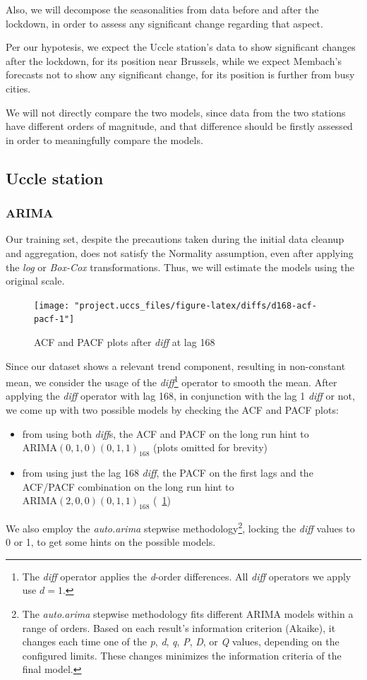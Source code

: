\documentclass[12pt]{article}
\begin{document}
Also, we will decompose the seasonalities from data before and after the lockdown, in order to assess any significant change regarding that aspect.

Per our hypotesis, we expect the Uccle station's data to show significant changes after the lockdown, for its position near Brussels, while we expect Membach's forecasts not to show any significant change, for its position is further from busy cities.

We will not directly compare the two models, since data from the two stations have different orders of magnitude, and that difference should be firstly assessed in order to meaningfully compare the models.

\subsection{Uccle station}
\subsubsection{ARIMA}
Our training set, despite the precautions taken during the initial data cleanup and aggregation, does not satisfy the Normality assumption, even after applying the \textit{log} or \textit{Box-Cox} transformations. Thus, we will estimate the models using the original scale.

\begin{figure}[h]
	\centering
	\texttt{[image: "project.uccs\_files/figure-latex/diffs/d168-acf-pacf-1"]}
	\caption{ACF and PACF plots after \textit{diff} at lag 168}
	\label{fig:uccs:p-acf}
\end{figure}
%
Since our dataset shows a relevant trend component, resulting in non-constant mean, we consider the usage of the \textit{diff}\footnote{The \textit{diff} operator applies the \textit{d}-order differences. All \textit{diff} operators we apply use $d=1$.} operator to smooth the mean.
After applying the \textit{diff} operator with lag 168, in conjunction with the lag 1 \textit{diff} or not, we come up with two possible models by checking the ACF and PACF plots:
\begin{itemize}[topsep=0.5em,itemsep=0em,partopsep=0.5em]
	\item from using both \textit{diff}s, the ACF and PACF on the long run hint to $\mathrm{ARIMA}(0,1,0)(0,1,1)_{168}$ (plots omitted for brevity)
	\item from using just the lag 168 \textit{diff}, the PACF on the first lags and the ACF/PACF combination on the long run hint to $\mathrm{ARIMA}(2,0,0)(0,1,1)_{168}$ (\figurename~\ref{fig:uccs:p-acf})
\end{itemize}
We also employ the \textit{auto.arima} stepwise methodology\footnote{\label{footnote:auto.arima}The \textit{auto.arima} stepwise methodology fits different ARIMA models within a range of orders. Based on each result's information criterion (Akaike), it changes each time one of the \textit{p}, \textit{d}, \textit{q}, \textit{P}, \textit{D}, or \textit{Q} values, depending on the configured limits. These changes minimizes the information criteria of the final model.}, locking the \textit{diff} values to 0 or 1, to get some hints on the possible models.
\end{document}
